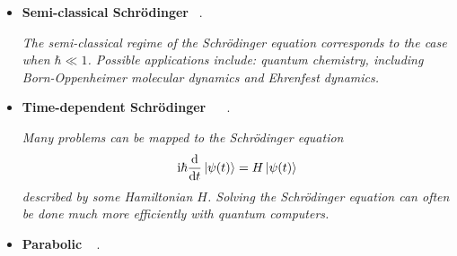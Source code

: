 \documentclass[12pt,letterpaper]{article}
\begin{document}
\begin{itemize}
\begin{itemize}
\begin{itemize}
\begin{itemize}
							\item \textbf{Poisson} ~\cite{bravo-prietoVariationalQuantumLinear2020,satoVariationalQuantumAlgorithm2021,aliPerformanceStudyVariational2022,sahaAdvancingAlgorithmScale2022,lubaschVariationalQuantumAlgorithms2020}, ~\cite{cuiOptimizationNoiseAnalysis2022},  ~\cite{caoQuantumAlgorithmCircuit2013}, ~\cite{arrazolaQuantumAlgorithmNonhomogeneous2019,ricardoAlternativesNonhomogeneousPartial2022,liuVariationalQuantumAlgorithm2021,wangQuantumFastPoisson2020,ghafourpour2025applicability}.

                          \textit{The Poisson equation is an elliptic PDE that relates a charge/mass density or velocity field with the electrical/gravitational potential or pressure field it originates, respectively. It takes the form}
                        $$ \nabla^2 \phi(x,y,z) = f(x,y,z) $$
                        \textit{This equation has significant applications in fluid dynamics (see Navier–Stokes equations).}
       
						\end{itemize}

                    \item \textbf{Semi-classical Schrödinger}  ~\cite{jinQuantumSimulationSemiclassical2022}.
                    
                    \textit{The semi-classical regime of the Schrödinger equation corresponds to the case when $\hbar \ll 1$. Possible applications include: quantum chemistry, including Born-Oppenheimer molecular dynamics and Ehrenfest dynamics.}
                    
                    \item \textbf{Time-dependent Schrödinger} ~\cite{joubert-doriolVariationalApproachLinearly2022}  ~\cite{jinQuantumSimulationSemiclassical2022}.

                    \textit{Many problems can be mapped to the Schrödinger equation $$\mathrm{i}\hbar \dv{t} \ket{\psi(t)} = H\ket{\psi(t)}$$ described by some Hamiltonian $H$. Solving the Schrödinger equation can often be done much more efficiently with quantum computers.}

                    \item \textbf{Parabolic} ~  \cite{patelQuantumInspiredTensorNeural2022}.
                    \begin{itemize} 


\end{itemize}
\end{itemize}
\end{itemize}
\end{itemize}
\end{document}

